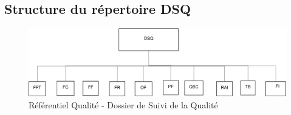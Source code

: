  \subsection{Structure du répertoire DSQ}

\begin{figure}[ht]
         \begin{center}
         \includegraphics[scale=0.5]{images/arboDSQ}
         \end{center}
         \caption{Référentiel Qualité - Dossier de Suivi de la Qualité}
 \end{figure}

